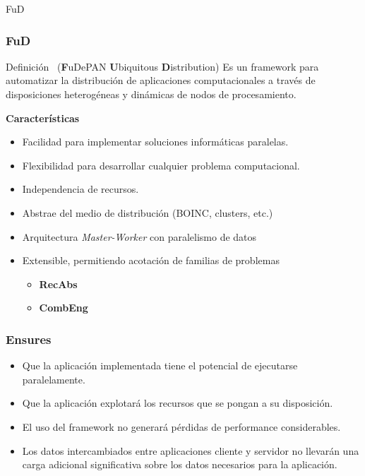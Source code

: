 \begin{subsection}{FuD}

\begin{frame}\frametitle{FuD}

    \begin{block}{Definición}
        \fud\ (\textbf{F}uDePAN \textbf{U}biquitous \textbf{D}istribution) Es un framework para automatizar la distribución de aplicaciones
        computacionales a través de disposiciones heterogéneas y dinámicas de nodos de procesamiento.
    \end{block}

    \pause
    \textbf{Características}
    \begin{itemize}
        \item Facilidad para implementar soluciones informáticas paralelas.
        \item Flexibilidad para desarrollar cualquier problema computacional.
        \item Independencia de recursos.
        \item Abstrae del medio de distribución (BOINC, clusters, etc.)
        \item Arquitectura \textit{Master-Worker} con paralelismo de datos
        \item Extensible, permitiendo acotación de familias de problemas
            \begin{itemize}
                \item \textbf{RecAbs}
                \item \textbf{CombEng}
            \end{itemize}
    \end{itemize}
    
\end{frame}

\begin{frame}\frametitle{Ensures}

    \begin{itemize}
        \item Que la aplicaci\'on implementada tiene el potencial de ejecutarse paralelamente.
        \item Que la aplicaci\'on explotar\'a los recursos que se pongan a su disposici\'on.
        \item El uso del framework no generar\'a p\'erdidas de performance considerables.
        \item Los datos intercambiados entre aplicaciones cliente y servidor no llevar\'an una carga adicional significativa sobre los datos
        necesarios para la aplicaci\'on.
        \end{itemize}
    \end{frame}


\end{subsection}
